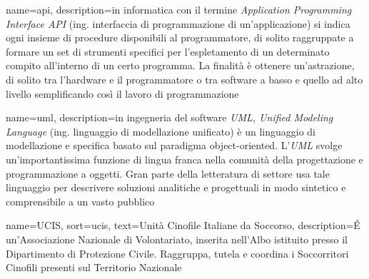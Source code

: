 \makeglossaries
\renewcommand{\acronymname}{Acronimi e abbreviazioni}


\renewcommand{\glossaryname}{Glossario}

{
    name=api,
    description={in informatica con il termine \emph{Application Programming Interface API} (ing. interfaccia di programmazione di un'applicazione) si indica ogni insieme di procedure disponibili al programmatore, di solito raggruppate a formare un set di strumenti specifici per l'espletamento di un determinato compito all'interno di un certo programma. La finalità è ottenere un'astrazione, di solito tra l'hardware e il programmatore o tra software a basso e quello ad alto livello semplificando così il lavoro di programmazione}
}

{
    name=uml,
    description={in ingegneria del software \emph{UML, Unified Modeling Language} (ing. linguaggio di modellazione unificato) è un linguaggio di modellazione e specifica basato sul paradigma object-oriented. L'\emph{UML} svolge un'importantissima funzione di lingua franca nella comunità della progettazione e programmazione a oggetti. Gran parte della letteratura di settore usa tale linguaggio per descrivere soluzioni analitiche e progettuali in modo sintetico e comprensibile a un vasto pubblico}
}

{
    name=UCIS,
    sort=ucis,
    text=Unità Cinofile Italiane da Soccorso,
    description={É un'Associazione Nazionale di Volontariato, inserita nell'Albo istituito presso il Dipartimento di Protezione Civile. Raggruppa, tutela e coordina i Soccorritori Cinofili presenti sul Territorio Nazionale}
}

